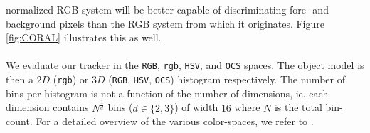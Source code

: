 \documentclass[a4paper,11pt]{article}
\begin{document}
			normalized-RGB system will be better capable of discriminating fore-
			and background pixels than the RGB system from which it originates.
			Figure \ref{fig:CORAL} illustrates this as well.
			\\ \\
			We evaluate our tracker in the \verb|RGB|, \verb|rgb|, \verb|HSV|, and
			\verb|OCS| spaces. The object model is then a $2D$ (\verb|rgb|) or $3D$
			(\verb|RGB|, \verb|HSV|, \verb|OCS|) histogram respectively. The number
			of bins per histogram is not a function of the number of dimensions, ie.
			each dimension contains $N^{\frac{1}{d}}$ bins ($d \in \{2, 3\}$) of width
			$16$ where $N$ is the total bin-count. For a detailed overview of the various
			color-spaces, we refer to \cite{COLOR}.

\end{document}
